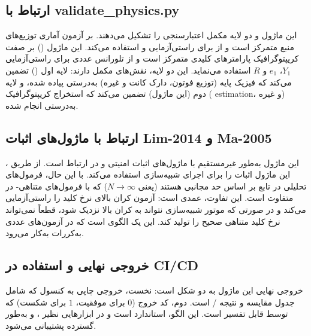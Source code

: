 \subsection{ارتباط با validate\_physics.py}

این ماژول و  دو لایه مکمل اعتبارسنجی را تشکیل می‌دهند.  بر آزمون آماری توزیع‌های منبع متمرکز است و از  برای راستی‌آزمایی  و  استفاده می‌کند. این ماژول () بر صفت کریپتوگرافیک پارامترهای کلیدی متمرکز است و از تلورانس عددی برای راستی‌آزمایی $Y_1$، $e_1$ و $R$ استفاده می‌نماید. این دو لایه، نقش‌های مکمل دارند: لایه اول () تضمین می‌کند که فیزیک پایه (توزیع  فوتون، دارک کانت و غیره) به‌درستی پیاده شده، و لایه دوم (این ماژول) تضمین می‌کند که استخراج کریپتوگرافیک ( estimation،  و غیره) به‌درستی انجام شده.

\subsection{ارتباط با ماژول‌های اثبات Lim-2014 و Ma-2005}

این ماژول به‌طور غیرمستقیم با ماژول‌های اثبات امنیتی  و  در ارتباط است. از طریق ، این ماژول اثبات  را برای اجرای شبیه‌سازی استفاده می‌کند. با این حال، فرمول‌های تحلیلی در تابع  بر اساس حد مجانبی هستند (یعنی $N \to \infty$) که با فرمول‌های متناهی- در  متفاوت است. این تفاوت، عمدی است: آزمون کران بالای نرخ کلید را راستی‌آزمایی می‌کند و در صورتی که موتور شبیه‌سازی نتواند به کران بالا نزدیک شود، قطعاً نمی‌تواند نرخ کلید متناهی صحیح را تولید کند. این یک الگوی  است که در آزمون‌های عددی به‌کررات به‌کار می‌رود.

\subsection{خروجی نهایی و استفاده در CI/CD}

خروجی نهایی این ماژول به دو شکل است: نخست، خروجی چاپی به کنسول که شامل جدول مقایسه و نتیجه / است. دوم، کد خروج  ($0$ برای موفقیت، $1$ برای شکست) که توسط  قابل تفسیر است. این الگو، استاندارد  است و در ابزارهایی نظیر ،  و  به‌طور گسترده پشتیبانی می‌شود.

